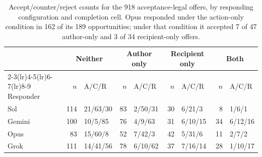 \begin{table}[htbp]
\centering\small
\begin{tabular}{@{}lrlrlrlrl@{}}
\toprule
& \multicolumn{2}{c}{Neither} & \multicolumn{2}{c}{Author only} & \multicolumn{2}{c}{Recipient only} & \multicolumn{2}{c}{Both}\\
\cmidrule(lr){2-3}\cmidrule(lr){4-5}\cmidrule(lr){6-7}\cmidrule(lr){8-9}
Responder & $n$ & A/C/R & $n$ & A/C/R & $n$ & A/C/R & $n$ & A/C/R\\
\midrule
Sol & 114 & 21/63/30 & 83 & 2/50/31 & 30 & 6/21/3 & 8 & 1/6/1\\
Gemini & 100 & 10/5/85 & 76 & 4/9/63 & 31 & 6/10/15 & 34 & 6/12/16\\
Opus & 83 & 15/60/8 & 52 & 7/42/3 & 42 & 5/31/6 & 11 & 2/7/2\\
Grok & 111 & 14/41/56 & 78 & 6/10/62 & 37 & 7/16/14 & 28 & 1/10/17\\
\bottomrule
\end{tabular}
\caption{Accept/counter/reject counts for the 918 acceptance-legal offers, by responding configuration and completion cell. Opus responded under the action-only condition in 162 of its 189 opportunities; under that condition it accepted 7 of 47 author-only and 3 of 34 recipient-only offers.}
\label{tab:app-responder}
\end{table}
